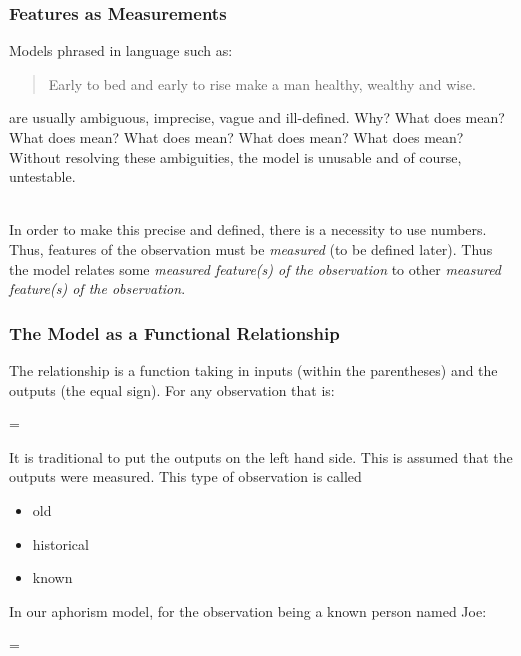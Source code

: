 \documentclass[slides]{beamer} %
\begin{document}
\begin{frame}\frametitle{Features as Measurements}
Models phrased in language such as:

\begin{quotation}
Early to bed and early to rise make a man healthy, wealthy and wise.
\end{quotation}

are usually ambiguous, imprecise, vague and ill-defined. Why? \pause What does  mean? What does  mean? What does  mean? What does  mean? What does  mean? Without resolving these ambiguities, \pause the model is unusable and of course, untestable. \\~\\ \pause

In order to make this precise and defined, there is a necessity to use numbers. \pause Thus, features of the observation must be \textit{measured} (to be defined later). \pause Thus the model relates some \textit{measured feature(s) of the observation} to other \textit{measured feature(s) of the observation}.  
	
\end{frame}

\begin{frame}\frametitle{The Model as a Functional Relationship}

\small
The relationship is a function taking in inputs (within the parentheses) and  the outputs (the equal sign). For any observation that is:

\beqn
{} = 
\eeqn

It is traditional to put the outputs on the left hand side. This is assumed that the outputs were measured. This type of observation is called 

\begin{itemize}
\item old 
\item historical
\item known
\end{itemize}

In our aphorism model, for the observation being a known person named Joe:

\tiny 
\beqn
{} = 
\eeqn
\normalsize

	
\end{frame}
\end{document}
